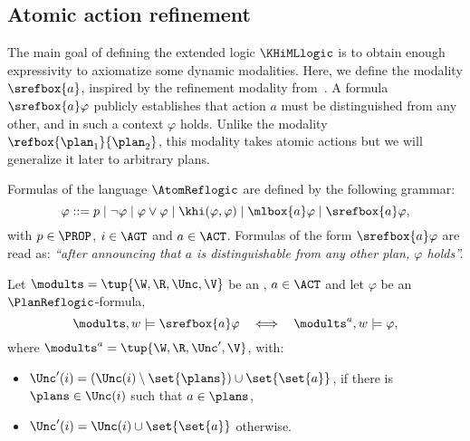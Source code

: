 \subsection{Atomic action refinement}
\label{subsec:atom-ref}

The main goal of defining the extended logic $\KHiMLlogic$ is to obtain enough expressivity to axiomatize some dynamic modalities. Here, we define the modality $\srefbox{a}$, inspired by the refinement modality from~. A formula $\srefbox{a}\varphi$ publicly establishes that action $a$ must be distinguished from any other, and in such a context $\varphi$ holds. Unlike the modality $\refbox{\plan_1}{\plan_2}$, this modality takes atomic actions but we will generalize it later to arbitrary plans. 

\medskip

\begin{definition}\label{def:ssrefsyntax}
Formulas of the language $\AtomReflogic$ are defined by the following grammar:
\[
\varphi ::= p \mid \neg\varphi \mid \varphi\vee\varphi \mid \khi(\varphi,\varphi) \mid \mlbox{a}\varphi \mid \srefbox{a}\varphi,
\]
with $p \in \PROP$, $i\in\AGT$ and $a \in \ACT$. Formulas of the form $\srefbox{a}\varphi$ are read as: \emph{``after announcing that $a$ is distinguishable from any other plan, $\varphi$ holds''.} 
\end{definition}

\medskip

\begin{definition}\label{def:ssrefsemantics}
Let $\modults = \tup{\W, \R, \Unc, \V}$ be an \ults, $a \in \ACT$ and let $\varphi$ be an  $\PlanReflogic$-formula,
\[
\modults,w \models \srefbox{a}\varphi \ \ \iff \ \ \modults^a,w \models \varphi,
\] 
where $\modults^a = \tup{\W,\R,\Unc',\V}$, with:
\begin{itemize}
\item $\Unc'(i) = (\Unc(i) \setminus \set{\plans}) \cup \set{\set{a}}$, if there is $\plans \in \Unc(i)$ such that $a \in \plans$,
\item $\Unc'(i) = \Unc(i) \cup \set{\set{a}}$ otherwise.
\end{itemize}
\end{definition}

